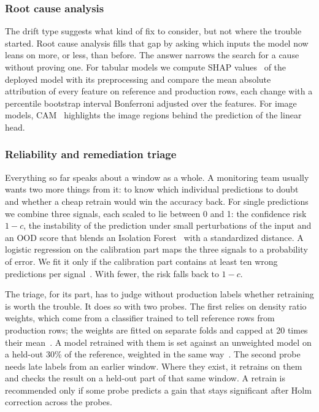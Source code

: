 \documentclass[pdflatex,referee,lineno,sn-basic]{sn-jnl}
\begin{document}
\subsubsection{Root cause analysis}\label{sec:rca}

The drift type suggests what kind of fix to consider, but not where the trouble started. Root cause analysis fills that gap by asking which inputs the model now leans on more, or less, than before. The answer narrows the search for a cause without proving one. For tabular models we compute SHAP values~\citep{lundberg2017unified} of the deployed model with its preprocessing and compare the mean absolute attribution of every feature on reference and production rows, each change with a percentile bootstrap interval Bonferroni adjusted over the features. For image models, CAM~\citep{zhou2016cam} highlights the image regions behind the prediction of the linear head.

\subsubsection{Reliability and remediation triage}\label{sec:triage}

Everything so far speaks about a window as a whole. A monitoring team usually wants two more things from it: to know which individual predictions to doubt and whether a cheap retrain would win the accuracy back. For single predictions we combine three signals, each scaled to lie between 0 and 1: the confidence risk $1-c$, the instability of the prediction under small perturbations of the input and an OOD score that blends an Isolation Forest~\citep{liu2008isolation} with a standardized distance. A logistic regression on the calibration part maps the three signals to a probability of error. We fit it only if the calibration part contains at least ten wrong predictions per signal~\citep{peduzzi1996}. With fewer, the risk falls back to $1-c$.

The triage, for its part, has to judge without production labels whether retraining is worth the trouble. It does so with two probes. The first relies on density ratio weights, which come from a classifier trained to tell reference rows from production rows; the weights are fitted on separate folds and capped at 20 times their mean~\citep{cortes2010weights}. A model retrained with them is set against an unweighted model on a held-out 30\% of the reference, weighted in the same way~\citep{shimodaira2000,sugiyama2007}. The second probe needs late labels from an earlier window. Where they exist, it retrains on them and checks the result on a held-out part of that same window. A retrain is recommended only if some probe predicts a gain that stays significant after Holm correction across the probes.
\end{document}

